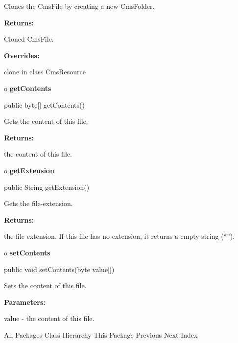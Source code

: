 \begin{description}
\htmlDD Clones the CmsFile by creating a new CmsFolder. 

\begin{description}
\item {\bf Returns:}  

Cloned CmsFile.  
\item {\bf Overrides:}  

clone in class CmsResource  
\end{description}

\end{description}

o {\bf getContents} 

\begin{PRE}
 public byte[] getContents()
\end{PRE}

\begin{description}
\htmlDD Gets the content of this file. 

\begin{description}
\item {\bf Returns:}  

the content of this file.  
\end{description}

\end{description}

o {\bf getExtension} 

\begin{PRE}
 public String getExtension()
\end{PRE}

\begin{description}
\htmlDD Gets the file-extension. 

\begin{description}
\item {\bf Returns:}  

the file extension. If this file has no extension, it returns a empty string
(``'').  
\end{description}

\end{description}

o {\bf setContents} 

\begin{PRE}
 public void setContents(byte value[])
\end{PRE}

\begin{description}
\htmlDD Sets the content of this file. 

\begin{description}
\item {\bf Parameters:}  

value - the content of this file.  
\end{description}

\end{description}

\htmlHR

\begin{PRE}
All Packages  Class Hierarchy  This Package  Previous  Next  Index
\end{PRE}

